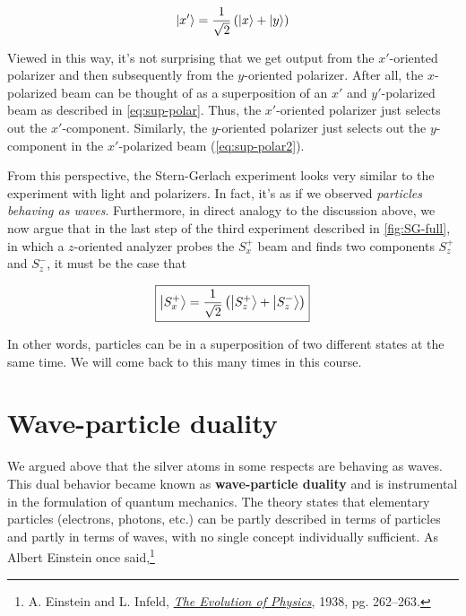 \begin{equation}
	\ket{x'} = \frac{1}{\sqrt{2}} \left( \ket{x} + \ket{y} \right) \label{eq:sup-polar2}
\end{equation}

Viewed in this way, it's not surprising that we get output from the $x'$-oriented polarizer and then subsequently from the $y$-oriented polarizer. 
After all, the $x$-polarized beam can be thought of as a superposition of an $x'$ and $y'$-polarized beam as described in \autoref{eq:sup-polar}. 
Thus, the $x'$-oriented polarizer just selects out the $x'$-component. 
Similarly, the $y$-oriented polarizer just selects out the $y$-component in the $x'$-polarized beam (\autoref{eq:sup-polar2}).

From this perspective, the Stern-Gerlach experiment looks very similar to the experiment with light and polarizers. 
In fact, it's as if we observed \emph{particles behaving as waves}. 
Furthermore, in direct analogy to the discussion above, we now argue that in the last step of the third experiment described in \autoref{fig:SG-full}, in which a $z$-oriented analyzer probes the $S_x^+$ beam and finds two components $S_z^+$ and $S_z^-$, it must be the case that

\begin{equation*}
	\boxed{\ket{S_x^+} = \frac{1}{\sqrt{2}} \left( \ket{S_z^+} + \ket{S_z^-} \right)}
\end{equation*}

In other words, particles can be in a superposition of two different states at the same time. 
We will come back to this many times in this course.


\section{Wave-particle duality}

We argued above that the silver atoms in some respects are behaving as waves. 
This dual behavior became known as \textbf{wave-particle duality} and is instrumental in the formulation of quantum mechanics. 
The theory states that elementary particles (electrons, photons, etc.) can be partly described in terms of particles and partly in terms of waves, with no single concept individually sufficient. 
As Albert Einstein once said,\footnote{A. Einstein and L. Infeld, \href{https://en.wikipedia.org/wiki/The_Evolution_of_Physics}{\emph{The Evolution of Physics}}, 1938, pg. 262--263.}

